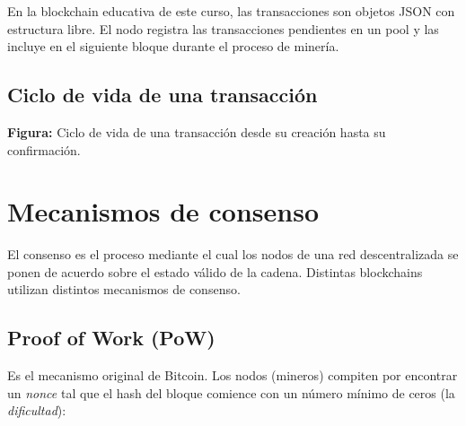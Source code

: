 \documentclass[
  coursetitle={Cómputo Nube y Tecnologías Emergentes},
  coursehours={96},
  coursedate={Verano 2026},
  doctype={Notas de clase},
  otherlangs={english,french},
  authorname={Lázaro},
  authorsurname={Bustio-Martínez},
  authortitle={PhD},
  role={Profesor Investigador},
  email={lbustio@inaoe.mx},
  phone={5559504000},
  ext={7459},
  institution={Instituto Nacional de Astrofísica, Óptica y Electrónica (INAOE)},
  department={Maestría en Ciencias en Tecnologías de Seguridad},
  address={Luis Enrique Erro 1, Sta. Ma. Tonantzintla, San Andrés Cholula, CP 72840, Puebla, México},
  margin={0.5in}
]{../../lbustio_lecture_notes}
\begin{document}
En la blockchain educativa de este curso, las transacciones son objetos JSON con estructura libre. El nodo registra las transacciones pendientes en un pool y las incluye en el siguiente bloque durante el proceso de minería.

\subsection{Ciclo de vida de una transacción}

\begin{center}

\small\textbf{Figura:} Ciclo de vida de una transacción desde su creación hasta su confirmación.
\end{center}

\section{Mecanismos de consenso}

El consenso es el proceso mediante el cual los nodos de una red descentralizada se ponen de acuerdo sobre el estado válido de la cadena. Distintas blockchains utilizan distintos mecanismos de consenso.

\subsection{Proof of Work (PoW)}

Es el mecanismo original de Bitcoin. Los nodos (mineros) compiten por encontrar un \textit{nonce} tal que el hash del bloque comience con un número mínimo de ceros (la \textit{dificultad}):
\end{document}
